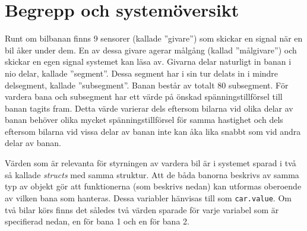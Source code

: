 \section{Begrepp och systemöversikt}

Runt om bilbanan finns 9 sensorer (kallade ''givare'') som skickar en signal när
en bil åker under dem. En av dessa givare agerar målgång (kallad ''målgivare'')
och skickar en egen signal systemet kan läsa av. Givarna delar naturligt in
banan i nio delar, kallade ''segment''. Dessa segment har i sin tur delats in i
mindre delsegment, kallade ''subsegment''. Banan består av totalt 80 subsegment.
För vardera bana och subsegment har ett värde på önskad spänningstillförsel till
banan tagits fram. Detta värde varierar dels eftersom bilarna vid olika delar av
banan behöver olika mycket spänningstillförsel för samma hastighet och dels
eftersom bilarna vid vissa delar av banan inte kan åka lika snabbt som vid andra
delar av banan.

Värden som är relevanta för styrningen av vardera bil är i systemet sparad i
två så kallade \emph{structs} med samma struktur. Att de båda banorna beskrivs
av samma typ av objekt gör att funktionerna (som beskrivs nedan) kan utformas
oberoende av vilken bana som hanteras. Dessa variabler hänvisas till som
\texttt{car.value}. Om två bilar körs finns det således två värden sparade för
varje variabel som är specifierad nedan, en för bana 1 och en för bana 2.

